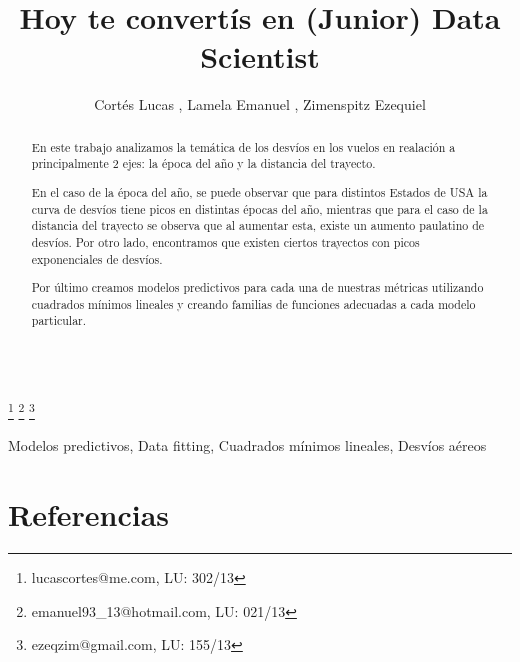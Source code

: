 \documentclass{endm}
\begin{document}
\begin{verbatim}\end{verbatim}\vspace{2.5cm}

\begin{frontmatter}

\title{Hoy te convert\'is en (Junior) Data Scientist}

\author{Cort\'es Lucas , Lamela Emanuel , Zimenspitz Ezequiel }
\address{Universidad de Buenos Aires\\ Buenos Aires, Argentina}

\thanks[lucasemail]{lucascortes@me.com, LU: 302/13}
\thanks[emanuelemail]{emanuel93\_13@hotmail.com, LU: 021/13}
\thanks[ezequielemail]{ezeqzim@gmail.com, LU: 155/13}

\begin{abstract}

En este trabajo analizamos la tem\'atica de los desv\'ios en los vuelos en realaci\'on a principalmente 2 ejes: la \'epoca del a\~no y la distancia del trayecto. 

En el caso de la \'epoca del a\~no, se puede observar que para distintos Estados de USA la curva de desv\'ios tiene picos en distintas \'epocas del a\~no, mientras que para el caso de la distancia del trayecto se observa que al aumentar esta, existe un aumento paulatino de desv\'ios. Por otro lado, encontramos que existen ciertos trayectos con picos exponenciales de desv\'ios.

Por \'ultimo creamos modelos predictivos para cada una de nuestras m\'etricas utilizando cuadrados m\'inimos lineales y creando familias de funciones adecuadas a cada modelo particular.

\end{abstract}

\begin{keyword}
Modelos predictivos, Data fitting, Cuadrados m\'inimos lineales, Desv\'ios a\'ereos
\end{keyword}

\end{frontmatter}









\section{Referencias}



\end{document}
